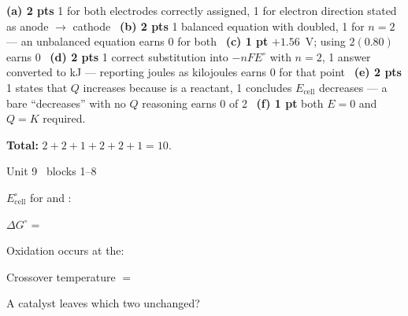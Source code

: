 \documentclass{apchem-worksheet}
\begin{document}
\begin{apcnote}
\textbf{(a) 2 pts} 1 for both electrodes correctly assigned, 1 for electron
direction stated as anode $\to$ cathode \textbullet\ \textbf{(b) 2 pts}
1 balanced equation with  doubled, 1 for $n = 2$ --- an unbalanced
equation earns 0 for both \textbullet\ \textbf{(c) 1 pt} $+1.56$~V; using
$2(0.80)$ earns 0 \textbullet\ \textbf{(d) 2 pts} 1 correct substitution
into $-nFE^\circ$ with $n = 2$, 1 answer converted to kJ --- reporting
joules as kilojoules earns 0 for that point \textbullet\ \textbf{(e) 2 pts}
1 states that $Q$ increases because  is a reactant, 1 concludes
$E_{\text{cell}}$ decreases --- a bare ``decreases'' with no $Q$ reasoning
earns 0 of 2 \textbullet\ \textbf{(f) 1 pt} both $E = 0$ and $Q = K$
required.

\textbf{Total: } $2 + 2 + 1 + 2 + 2 + 1 = 10$.
\end{apcnote}

\begin{spiralstrip}{Unit 9 \textbullet\ blocks 1--8}
  \item $E^\circ_{\text{cell}}$ for  and :
  \item $\Delta G^\circ = $ 
  \item Oxidation occurs at the: 
  \item Crossover temperature $= $ 
  \item A catalyst leaves which two unchanged?
\end{spiralstrip}
\end{document}
